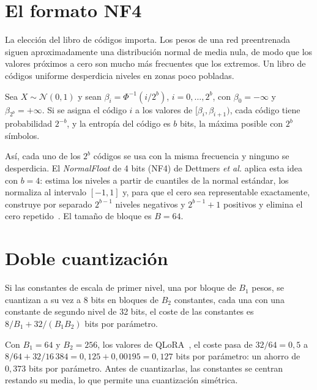 \section{El formato NF4}

La elección del libro de códigos importa. Los pesos de una red preentrenada siguen aproximadamente una distribución normal de media nula, de modo que los valores próximos a cero son mucho más frecuentes que los extremos. Un libro de códigos uniforme desperdicia niveles en zonas poco pobladas.

\begin{proposicion}\label{prop:cuantiles}
Sea $X\sim\mathcal{N}(0,1)$ y sean $\beta_i=\Phi^{-1}(i/2^{b})$, $i=0,\dots,2^{b}$, con $\beta_0=-\infty$ y $\beta_{2^{b}}=+\infty$. Si se asigna el código $i$ a los valores de $[\beta_i,\beta_{i+1})$, cada código tiene probabilidad $2^{-b}$, y la entropía del código es $b$ bits, la máxima posible con $2^{b}$ símbolos.
\end{proposicion}

Así, cada uno de los $2^{b}$ códigos se usa con la misma frecuencia y ninguno se desperdicia. El \emph{NormalFloat} de 4 bits (NF4) de Dettmers \emph{et al.} aplica esta idea con $b=4$: estima los niveles a partir de cuantiles de la normal estándar, los normaliza al intervalo $[-1,1]$ y, para que el cero sea representable exactamente, construye por separado $2^{b-1}$ niveles negativos y $2^{b-1}+1$ positivos y elimina el cero repetido~\cite[§3]{dettmers}. El tamaño de bloque es $B=64$.

\addtocounter{definicion}{1}%

\section{Doble cuantización}

\begin{proposicion}\label{prop:doble}
Si las constantes de escala de primer nivel, una por bloque de $B_1$ pesos, se cuantizan a su vez a 8 bits en bloques de $B_2$ constantes, cada una con una constante de segundo nivel de 32 bits, el coste de las constantes es $8/B_1+32/(B_1B_2)$ bits por parámetro.
\end{proposicion}

Con $B_1=64$ y $B_2=256$, los valores de QLoRA~\cite[§3]{dettmers}, el coste pasa de $32/64=0{,}5$ a $8/64+32/16\,384=0{,}125+0{,}00195=0{,}127$ bits por parámetro: un ahorro de $0{,}373$ bits por parámetro. Antes de cuantizarlas, las constantes se centran restando su media, lo que permite una cuantización simétrica.

